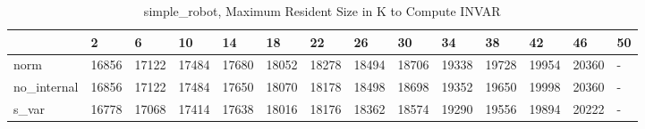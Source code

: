 \begin{table}
\caption{simple_robot, Maximum Resident Size in K to Compute INVAR}
\label{simple_robot_INVAR_size}
\begin{tabular}{llllllllllllll}
\toprule
 & 2 & 6 & 10 & 14 & 18 & 22 & 26 & 30 & 34 & 38 & 42 & 46 & 50 \\
\midrule
norm & 16856 & 17122 & 17484 & 17680 & 18052 & 18278 & 18494 & 18706 & 19338 & 19728 & 19954 & 20360 & - \\
no_internal & 16856 & 17122 & 17484 & 17650 & 18070 & 18178 & 18498 & 18698 & 19352 & 19650 & 19998 & 20360 & - \\
s_var & 16778 & 17068 & 17414 & 17638 & 18016 & 18176 & 18362 & 18574 & 19290 & 19556 & 19894 & 20222 & - \\
\bottomrule
\end{tabular}
\end{table}
